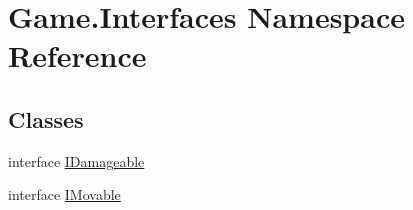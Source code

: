\hypertarget{namespace_game_1_1_interfaces}{}\section{Game.\+Interfaces Namespace Reference}
\label{namespace_game_1_1_interfaces}
\subsection*{Classes}
\begin{DoxyCompactItemize}
\item 
interface \mbox{\hyperlink{interface_game_1_1_interfaces_1_1_i_damageable}{I\+Damageable}}
\item 
interface \mbox{\hyperlink{interface_game_1_1_interfaces_1_1_i_movable}{I\+Movable}}
\end{DoxyCompactItemize}
